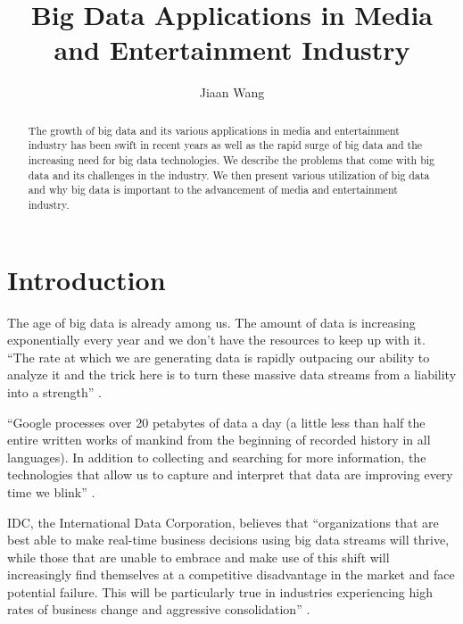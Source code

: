 \documentclass[sigconf]{acmart}
\begin{document}
\title{Big Data Applications in Media and Entertainment Industry}


\author{Jiaan Wang}


\begin{abstract}

    The growth of big data and its various applications in media and entertainment 
    industry has been swift in recent years as well as the rapid surge of big data 
    and the increasing need for big data technologies. We describe the problems 
    that come with big data and its challenges in the industry. We then present 
    various utilization of big data and why big data is important to the advancement 
    of media and entertainment industry. 
    
\end{abstract}


\maketitle

\section{Introduction}

The age of big data is already among us. The amount of data is increasing exponentially every year and we don't have the resources to keep up with it. ``The rate at which we are generating data is rapidly outpacing our ability to analyze it and the trick here is to turn these massive data streams from a liability into a strength'' \cite{Browning2015laptop}. 

``Google processes over 20 petabytes of data a day (a little less than half the entire written works of mankind from the beginning of recorded history in all languages). In addition to collecting and searching for more information, the technologies that allow us to capture and interpret that data are improving every time we blink'' \cite{Schlieski2012data}.

IDC, the International Data Corporation, believes that ``organizations that are best able to make real-time business decisions using big data streams will thrive, while those that are unable to embrace and make use of this shift will increasingly find themselves at a competitive disadvantage in the market and face potential failure. This will be particularly true in industries experiencing high rates of business change and aggressive consolidation'' \cite{Villars2011care}.
\end{document}
